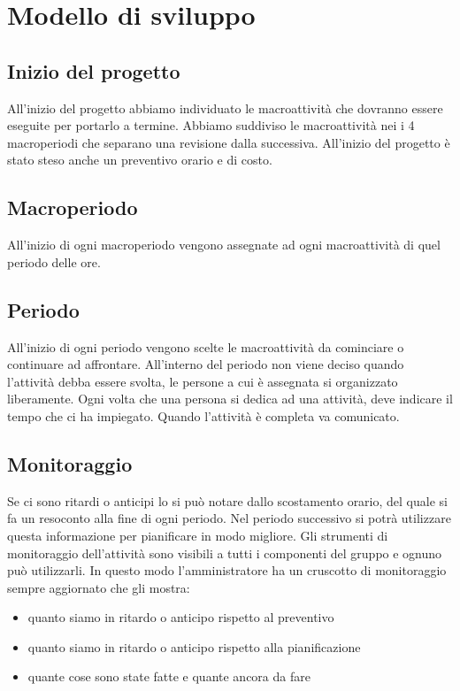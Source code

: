 \section{Modello di sviluppo}


\subsection{Inizio del progetto}
All'inizio del progetto abbiamo individuato le macroattività che dovranno essere eseguite per portarlo a termine.
Abbiamo suddiviso le macroattività nei i 4 macroperiodi che separano una revisione dalla successiva.
All'inizio del progetto è stato steso anche un preventivo orario e di costo.
\subsection{Macroperiodo}
All'inizio di ogni macroperiodo vengono assegnate ad ogni macroattività di quel periodo delle ore.
\subsection{Periodo}
All'inizio di ogni periodo vengono scelte le macroattività da cominciare o continuare ad affrontare.
All'interno del periodo non viene deciso quando l'attività debba essere svolta, le persone a cui è assegnata si organizzato liberamente.
Ogni volta che una persona si dedica ad una attività, deve indicare il tempo che ci ha impiegato.
Quando l'attività è completa va comunicato.

\subsection{Monitoraggio}
Se ci sono ritardi o anticipi lo si può notare dallo scostamento orario, del quale si fa un resoconto alla fine di ogni periodo. Nel periodo successivo si potrà utilizzare questa informazione per pianificare in modo migliore.
Gli strumenti di monitoraggio dell'attività sono visibili a tutti i componenti del gruppo e ognuno può utilizzarli. In questo modo l'amministratore ha un cruscotto di monitoraggio sempre aggiornato che gli mostra:
\begin{itemize}
	\item quanto siamo in ritardo o anticipo rispetto al preventivo
	\item quanto siamo in ritardo o anticipo rispetto alla pianificazione
	\item quante cose sono state fatte e quante ancora da fare
\end{itemize}


